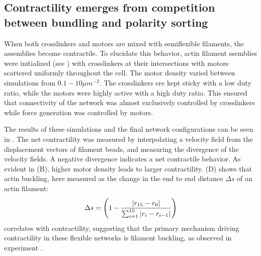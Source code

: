 \documentclass[12pt]{article}
\begin{document}
\subsection{Contractility emerges from competition between bundling and polarity sorting}
\par
When both crosslinkers and motors are mixed with semiflexible filaments, the
assemblies become contractile. To elucidate this behavior, actin filament 
ssemblies were initialized (see ) with crosslinkers at their
intersections with motors scattered uniformly throughout the cell. The motor
density varied between simulations from $0.1-10\mu m^{-2}$. The crosslinkers 
ere kept sticky with a low duty ratio, while the motors were highly active with
a high duty ratio. This ensured that connectivity of the network was almost
exclusively controlled by crosslinkers while force generation was controlled by
motors. 
\par
The results of these simulations and the final network configurations can be
seen in . The net contractility was measured by
interpolating a velocity field from the displacement vectors of filament beads,
and measuring the divergence of the velocity fields. A negative divergence
indicates a net contractile behavior. As evident in (B),
higher motor density leads to larger contractility. (D) shows
that actin buckling, here measured as the change in the end to end distance
$\Delta s$ of an actin filament:
\begin{equation} 
  \Delta s = \left(1 - {|r_{15}-r_0|\over\sum_{i=1}^{15}{|r_i-r_{i-1}|}}\right) 
  \label{eqn:fil_strain}
\end{equation}
correlates with contractility, suggesting that the primary mechanism driving
contractility in these flexible networks is filament buckling, as observed 
in experiment \cite{murrell2012}. 
\end{document}
